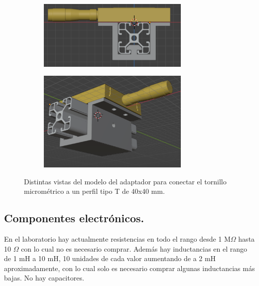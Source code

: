 \begin{figure}[!ht]
		\begin{minipage}[c]{0.5\textwidth}
		\begin{subfigure}{\textwidth}
			\centering
			\includegraphics[width=0.8\textwidth]{Figures/21_04_2025/Vista_lateral_tornillo_perfil}
			\captionsetup{width=0.8\textwidth}
		\end{subfigure}
	\end{minipage}\begin{minipage}[c]{0.49\textwidth}
		\begin{subfigure}{\textwidth}
			\centering
			\includegraphics[width=0.8\textwidth]{Figures/21_04_2025/Vista_3_4_tornillo_perfil1}
			\captionsetup{width=0.8\textwidth}
		\end{subfigure}
	\end{minipage}

	\caption{Distintas vistas del modelo del adaptador para conectar el tornillo micrométrico a un perfil tipo T de 40x40 mm.}
	\label{fig:}
\end{figure}







\subsection*{Componentes electrónicos.}
En el laboratorio hay actualmente resistencias en todo el rango desde 1 M$\Omega$ hasta 10 $\Omega$ con lo cual no es necesario comprar. Además hay inductancias en el rango de 1 mH a 10 mH, 10 unidades de cada valor aumentando de a 2 mH aproximadamente, con lo cual solo es necesario comprar algunas inductancias más bajas. No hay capacitores.

